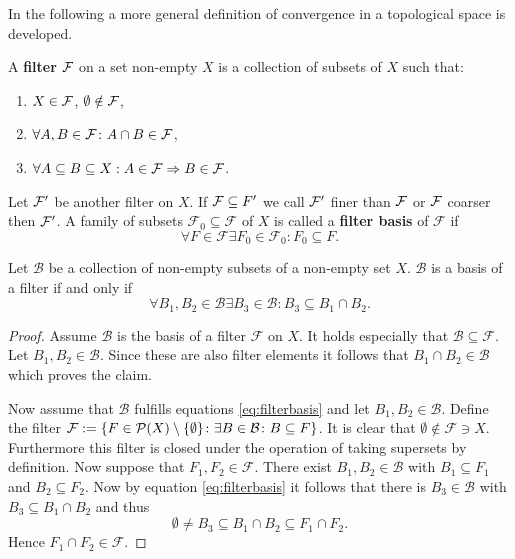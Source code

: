 In the following a more general definition of convergence in a topological space is developed.
\begin{defin}
  A \textbf{filter} $\F$ on a set non-empty $X$ is a collection of subsets of $X$ such that:
  \begin{enumerate}
    \item $X \in \F$, $\emptyset \notin \F$,
    \item $\forall A, B \in \F\colon A\cap B \in \F$,
    \item $\forall A \subseteq B \subseteq X: A \in \F \Rightarrow B \in \F$.
  \end{enumerate}
  Let $\F'$ be another filter on $X$. If $\F \subseteq F'$ we call $\F'$ finer than $\F$ or $\F$ coarser then $\F'$. A family of subsets $\mathcal{F}_0 \subseteq \mathcal{F}$ of $X$ is called a \textbf{filter basis} of $\mathcal{F}$ if
  \begin{equation*}
    \forall F \in \mathcal{F} \exists F_0 \in \mathcal{F}_0\colon F_0 \subseteq F.
  \end{equation*}
\end{defin}

\begin{lemma}\label{lem:filbas}
  Let $\mathcal{B}$ be a collection of non-empty subsets of a non-empty set $X$. $\mathcal{B}$ is a basis of a filter if and only if
  \begin{equation}\label{eq:filterbasis}
    \forall B_1, B_2 \in \mathcal{B}\exists B_3 \in \mathcal{B}: B_3 \subseteq B_1 \cap B_2.
  \end{equation}
\end{lemma}

\begin{proof}
  Assume $\mathcal{B}$ is the basis of a filter $\mathcal{F}$ on $X$. It holds especially that $\mathcal{B} \subseteq \mathcal{F}$. Let $B_1, B_2 \in \mathcal{B}$. Since these are also filter elements it follows that $B_1 \cap B_2 \in \mathcal{B}$ which proves the claim.

  Now assume that $\mathcal{B}$ fulfills equations \ref{eq:filterbasis} and let $B_1, B_2 \in \mathcal{B}$. Define the filter $\mathcal{F} := \{ F \in \P(X)\setminus\{ \emptyset \}\colon \exists B\in\mathcal{B}\colon B \subseteq F \}$. It is clear that $\emptyset \notin \mathcal{F} \ni X$. Furthermore this filter is closed under the operation of taking supersets by definition. Now suppose that $F_1, F_2 \in \mathcal{F}$. There exist $B_1, B_2 \in \mathcal{B}$ with $B_1 \subseteq F_1$ and $B_2 \subseteq F_2$. Now by equation \ref{eq:filterbasis} it follows that there is $B_3 \in \mathcal{B}$ with $B_3 \subseteq B_1 \cap B_2$ and thus
  \begin{equation*}
    \emptyset \neq B_3 \subseteq B_1 \cap B_2 \subseteq F_1 \cap F_2.
  \end{equation*}
  Hence $F_1 \cap F_2 \in \mathcal{F}$.
\end{proof}

